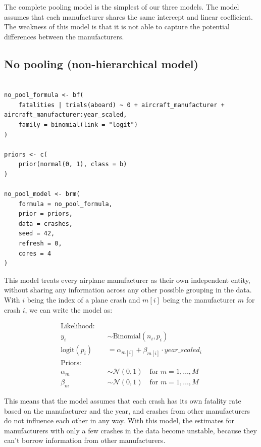\documentclass[12pt,a4paper]{article}
\begin{document}
The complete pooling model is the simplest of our three models. The model assumes that each manufacturer shares the same intercept and linear coefficient. The weakness of this model is that it is not able to capture the potential differences between the manufacturers.


\subsection{No pooling (non-hierarchical model)}

\begin{lstlisting}

no_pool_formula <- bf(
    fatalities | trials(aboard) ~ 0 + aircraft_manufacturer + aircraft_manufacturer:year_scaled,
    family = binomial(link = "logit")
)

priors <- c(
    prior(normal(0, 1), class = b)
)

no_pool_model <- brm(
    formula = no_pool_formula,
    prior = priors,
    data = crashes,
    seed = 42,
    refresh = 0,
    cores = 4
)
\end{lstlisting}

This model treats every airplane manufacturer as their own independent entity, without sharing any information across any other possible grouping in the data. With $i$ being the index of a plane crash and $m[i]$ being the manufacturer $m$ for crash $i$, we can write the model as:

\begin{align*}
  \text{Likelihood:} \quad &                                                           \\
  y_i                      & \sim \text{Binomial}(n_i, p_i)                            \\
  \text{logit}(p_i)        & = \alpha_{m[i]} + \beta_{m[i]} \cdot year\_scaled_i       \\[1em]
  \text{Priors:} \quad     &                                                           \\
  \alpha_m                 & \sim \mathcal{N}(0, 1) \quad \text{for } m = 1, \ldots, M \\
  \beta_m                  & \sim \mathcal{N}(0, 1) \quad \text{for } m = 1, \ldots, M
\end{align*}

This means that the model assumes that each crash has its own fatality rate based on the manufacturer and the year, and crashes from other manufacturers do not influence each other in any way. With this model, the estimates for manufacturers with only a few crashes in the data become unstable, because they can't borrow information from other manufacturers.
\end{document}
